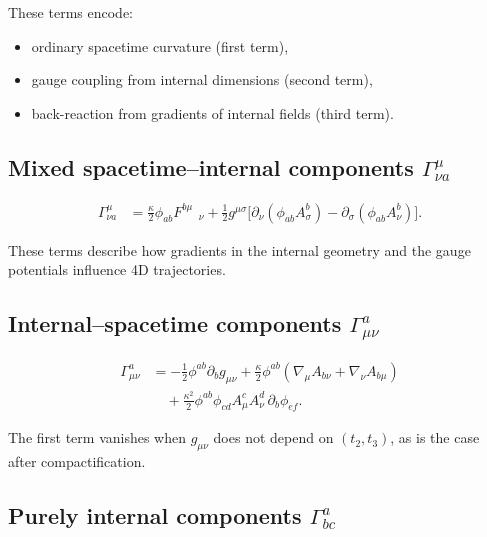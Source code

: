 \documentclass[12pt]{article}
\begin{document}
These terms encode:
\begin{itemize}
\item ordinary spacetime curvature (first term),
\item gauge coupling from internal dimensions (second term),
\item back-reaction from gradients of internal fields (third term).
\end{itemize}


\subsection{Mixed spacetime–internal components \texorpdfstring{$\Gamma^\mu_{\nu a}$}{Gamma}}

\begin{align}
\Gamma^\mu_{\nu a}
&=
\frac{\kappa}{2}\phi_{ab}F^{b\mu}{}_{\;\;\nu}
+ \frac{1}{2} g^{\mu\sigma}
\Big[
\partial_\nu(\phi_{ab}A^b_\sigma)
-\partial_\sigma(\phi_{ab}A^b_\nu)
\Big].
\end{align}

These terms describe how gradients in the internal geometry and the gauge
potentials influence 4D trajectories.


\subsection{Internal–spacetime components \texorpdfstring{$\Gamma^a_{\mu\nu}$}{Gamma}}

\begin{align}
\Gamma^a_{\mu\nu}
&=
-\frac{1}{2}\phi^{ab}\partial_b g_{\mu\nu}
+ \frac{\kappa}{2}\phi^{ab}
\left(
\nabla_\mu A_{b\nu}
+ \nabla_\nu A_{b\mu}
\right)
\nonumber\\
&\quad
+ \frac{\kappa^2}{2}\phi^{ab}\phi_{cd}A^c_\mu A^d_\nu\, \partial_b \phi_{ef}.
\end{align}

The first term vanishes when \(g_{\mu\nu}\) does not depend on \((t_2,t_3)\),
as is the case after compactification.


\subsection{Purely internal components \texorpdfstring{$\Gamma^a_{bc}$}{Gamma}}
\end{document}
